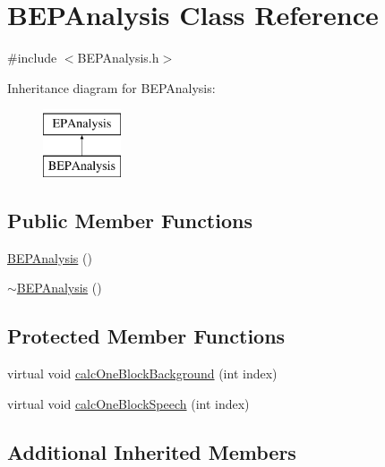 \hypertarget{class_b_e_p_analysis}{\section{B\+E\+P\+Analysis Class Reference}
\label{class_b_e_p_analysis}
}


{\ttfamily \#include $<$B\+E\+P\+Analysis.\+h$>$}

Inheritance diagram for B\+E\+P\+Analysis\+:\begin{figure}[H]
\begin{center}
\leavevmode
\includegraphics[height=2.000000cm]{class_b_e_p_analysis}
\end{center}
\end{figure}
\subsection*{Public Member Functions}
\begin{DoxyCompactItemize}
\item 
\hyperlink{class_b_e_p_analysis_ae1535efdce6c76552806f4877b344876}{B\+E\+P\+Analysis} ()
\item 
\hyperlink{class_b_e_p_analysis_acc98219f135576547fcd68e39e856e8a}{$\sim$\+B\+E\+P\+Analysis} ()
\end{DoxyCompactItemize}
\subsection*{Protected Member Functions}
\begin{DoxyCompactItemize}
\item 
virtual void \hyperlink{class_b_e_p_analysis_ace11d41c17bd9fbbbdddb85ccccb070e}{calc\+One\+Block\+Background} (int index)
\item 
virtual void \hyperlink{class_b_e_p_analysis_ab508a682d38fbc58319ea48bfaa54615}{calc\+One\+Block\+Speech} (int index)
\end{DoxyCompactItemize}
\subsection*{Additional Inherited Members}


